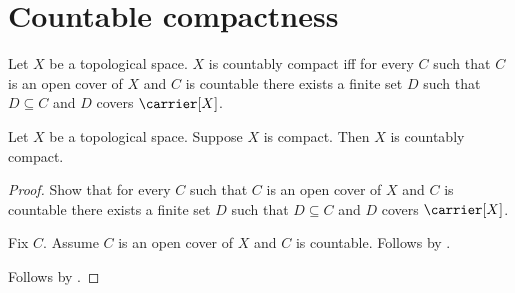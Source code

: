 \section{Countable compactness}








\begin{definition}\label{is_countably_compact}
    Let $X$ be a topological space.
    $X$ is countably compact iff for every $C$ such that
        $C$ is an open cover of $X$ and $C$ is countable
        there exists a finite set $D$ such that
            $D\subseteq C$ and $D$ covers $\carrier[X]$.
\end{definition}

\begin{theorem}\label{compact_implies_countably_compact}
    Let $X$ be a topological space.
    Suppose $X$ is compact.
    Then $X$ is countably compact.
\end{theorem}
\begin{proof}
    Show that for every $C$ such that
        $C$ is an open cover of $X$ and $C$ is countable
        there exists a finite set $D$ such that
            $D\subseteq C$ and $D$ covers $\carrier[X]$.
    \begin{subproof}
        Fix $C$.
        Assume $C$ is an open cover of $X$ and $C$ is countable.
        Follows by .
    \end{subproof}
    Follows by .
\end{proof}

